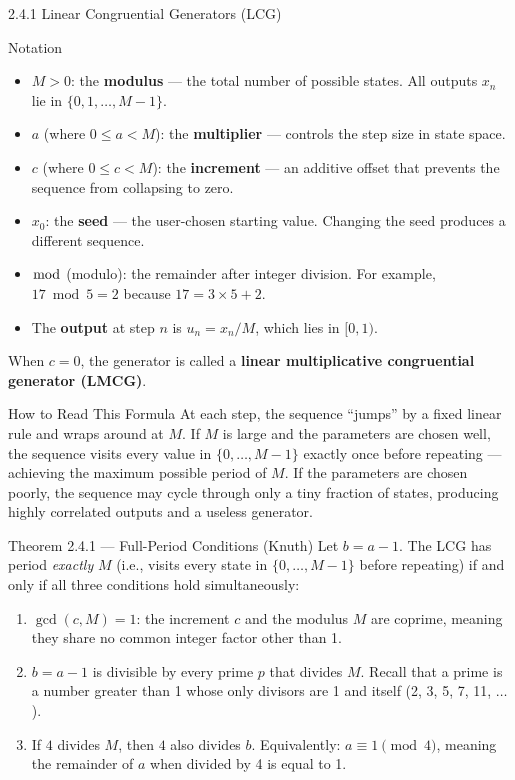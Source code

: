 \documentclass[aspectratio=169,10pt]{beamer}
\begin{document}
\begin{frame}[allowframebreaks]{2.4.1 Linear Congruential Generators (LCG)}
\begin{block}{Notation}
\begin{itemize}
  \item $M > 0$: the \textbf{modulus} --- the total number of possible
    states.  All outputs $x_n$ lie in $\{0, 1, \ldots, M-1\}$.
  \item $a$ (where $0 \le a < M$): the \textbf{multiplier} --- controls the
    step size in state space.
  \item $c$ (where $0 \le c < M$): the \textbf{increment} --- an additive
    offset that prevents the sequence from collapsing to zero.
  \item $x_0$: the \textbf{seed} --- the user-chosen starting value.
    Changing the seed produces a different sequence.
  \item $\bmod$ (modulo): the remainder after integer division.
    For example, $17 \bmod 5 = 2$ because $17 = 3 \times 5 + 2$.
  \item The \textbf{output} at step $n$ is $u_n = x_n / M$, which lies
    in $[0,1)$.
\end{itemize}
When $c = 0$, the generator is called a \textbf{linear multiplicative
congruential generator (LMCG)}.
\end{block}

\begin{alertblock}{How to Read This Formula}
At each step, the sequence ``jumps'' by a fixed linear rule and wraps
around at $M$.  If $M$ is large and the parameters are chosen well, the
sequence visits every value in $\{0,\ldots,M-1\}$ exactly once before
repeating --- achieving the maximum possible period of $M$.  If the
parameters are chosen poorly, the sequence may cycle through only a tiny
fraction of states, producing highly correlated outputs and a useless
generator.
\end{alertblock}

\framebreak

\begin{block}{Theorem 2.4.1 --- Full-Period Conditions (Knuth)}
Let $b = a - 1$.  The LCG has period \emph{exactly} $M$ (i.e., visits
every state in $\{0,\ldots,M-1\}$ before repeating) if and only if all
three conditions hold simultaneously:
\begin{enumerate}
  \item $\gcd(c, M) = 1$: the increment $c$ and the modulus $M$ are
    coprime, meaning they share no common integer factor other than 1.
  \item $b = a - 1$ is divisible by every prime $p$ that divides $M$.
    Recall that a prime is a number greater than 1 whose only divisors are
    1 and itself (2, 3, 5, 7, 11, $\ldots$).
  \item If $4$ divides $M$, then $4$ also divides $b$.  Equivalently:
    $a \equiv 1 \pmod{4}$, meaning the remainder of $a$ when divided by
    4 is equal to 1.
\end{enumerate}
\end{block}


\end{frame}
\end{document}
